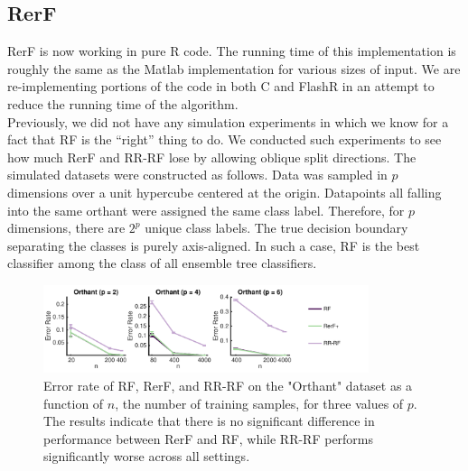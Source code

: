 \documentclass[simplex.tex]{subfiles}
\begin{document}
\subsection{RerF}

RerF is now working in pure R code.  The running time of this
implementation is roughly the same as the Matlab implementation for
various sizes of input.  We are re-implementing portions of the code in
both C and FlashR in an attempt to reduce the running time of the
algorithm. \\


Previously, we did not have any simulation experiments in which we know
for a fact that RF is the ``right'' thing to do. We conducted such
experiments to see how much RerF and RR-RF lose by allowing oblique
split directions. The simulated datasets were constructed as follows.
Data was sampled in $p$ dimensions over a unit hypercube centered at the
origin. Datapoints all falling into the same orthant were assigned the
same class label. Therefore, for $p$ dimensions, there are $2^p$ unique
class labels. The true decision boundary separating the classes is
purely axis-aligned. In such a case, RF is the best classifier among the
class of all ensemble tree classifiers.

\begin{figure}[!h]
\begin{cframed}
\centering
\includegraphics[width=0.85\textwidth]{../../figs/RerF.pdf}
\caption{Error rate of RF, RerF, and RR-RF on the "Orthant" dataset as a
  function of $n$, the number of training samples, for three values of
  $p$. The results indicate that there is no significant difference in
  performance between RerF and RF, while RR-RF performs significantly
  worse across all settings.}
\label{fig:name}
\end{cframed}
\end{figure}


\clearpage
\end{document}

